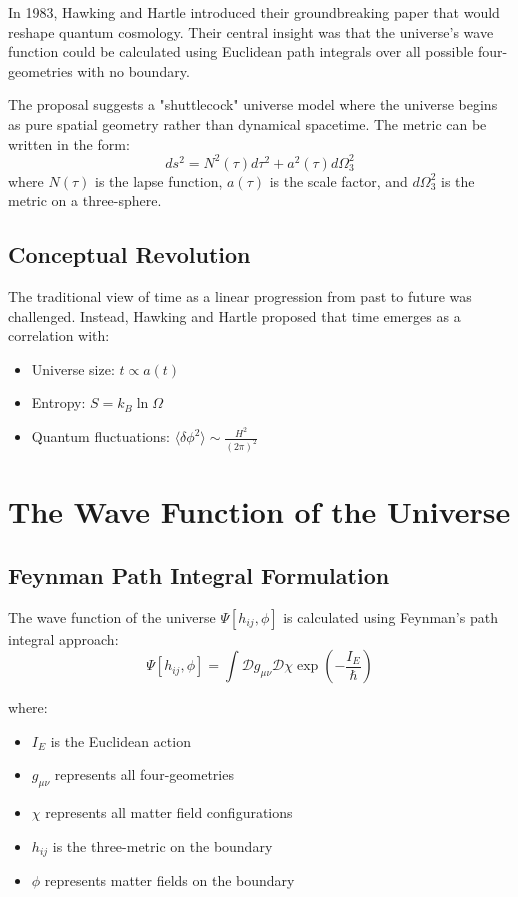 \documentclass[12pt,a4paper]{article}
\begin{document}
In 1983, Hawking and Hartle introduced their groundbreaking paper that would reshape quantum cosmology. Their central insight was that the universe's wave function could be calculated using Euclidean path integrals over all possible four-geometries with no boundary.

The proposal suggests a "shuttlecock" universe model where the universe begins as pure spatial geometry rather than dynamical spacetime. The metric can be written in the form:
\begin{equation}
ds^2 = N^2(\tau)d\tau^2 + a^2(\tau)d\Omega_3^2
\end{equation}
where $N(\tau)$ is the lapse function, $a(\tau)$ is the scale factor, and $d\Omega_3^2$ is the metric on a three-sphere.

\subsection{Conceptual Revolution}

The traditional view of time as a linear progression from past to future was challenged. Instead, Hawking and Hartle proposed that time emerges as a correlation with:
\begin{itemize}
    \item Universe size: $t \propto a(t)$
    \item Entropy: $S = k_B \ln \Omega$
    \item Quantum fluctuations: $\langle\delta\phi^2\rangle \sim \frac{H^2}{(2\pi)^2}$
\end{itemize}

\section{The Wave Function of the Universe}

\subsection{Feynman Path Integral Formulation}

The wave function of the universe $\Psi[h_{ij}, \phi]$ is calculated using Feynman's path integral approach:
\begin{equation}
\Psi[h_{ij}, \phi] = \int \mathcal{D}g_{\mu\nu} \mathcal{D}\chi \exp\left(-\frac{I_E}{\hbar}\right)
\end{equation}

where:
\begin{itemize}
    \item $I_E$ is the Euclidean action
    \item $g_{\mu\nu}$ represents all four-geometries
    \item $\chi$ represents all matter field configurations
    \item $h_{ij}$ is the three-metric on the boundary
    \item $\phi$ represents matter fields on the boundary
\end{itemize}
\end{document}
